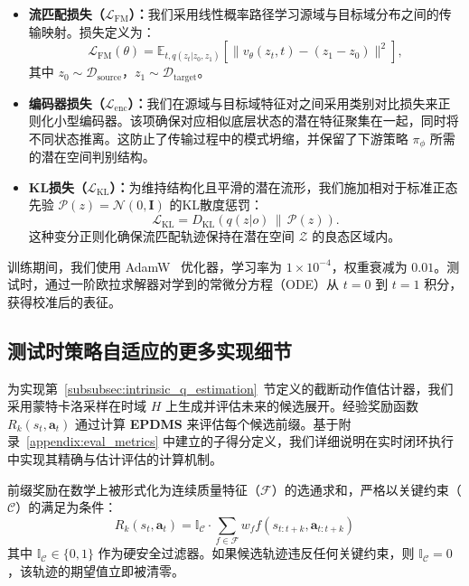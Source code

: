 \documentclass{article}
\begin{document}
\begin{itemize}
    \item \textbf{流匹配损失（$\mathcal{L}_{\mathrm{FM}}$）：}我们采用线性概率路径学习源域与目标域分布之间的传输映射。损失定义为：
    \begin{equation}
        \mathcal{L}_{\mathrm{FM}}(\theta) = \mathbb{E}_{t, q(z_t|z_0, z_1)} \left[ \| v_\theta(z_t, t) - (z_1 - z_0) \|^2 \right],
    \end{equation}
    其中 $z_0 \sim \mathcal{D}_{\mathrm{source}}$，$z_1 \sim \mathcal{D}_{\mathrm{target}}$。

    \item \textbf{编码器损失（$\mathcal{L}_{\mathrm{enc}}$）：}我们在源域与目标域特征对之间采用类别对比损失来正则化小型编码器。该项确保对应相似底层状态的潜在特征聚集在一起，同时将不同状态推离。这防止了传输过程中的模式坍缩，并保留了下游策略 $\pi_\phi$ 所需的潜在空间判别结构。

    \item \textbf{KL损失（$\mathcal{L}_{\mathrm{KL}}$）：}为维持结构化且平滑的潜在流形，我们施加相对于标准正态先验 $\mathcal{P}(z) = \mathcal{N}(0, \mathbf{I})$ 的KL散度惩罚：
    \begin{equation}
        \mathcal{L}_{\mathrm{KL}} = D_{\mathrm{KL}}(q(z|o) \,\|\, \mathcal{P}(z)).
    \end{equation}
    这种变分正则化确保流匹配轨迹保持在潜在空间 $\mathcal{Z}$ 的良态区域内。
\end{itemize}

训练期间，我们使用 AdamW~\cite{kingma2014adam} 优化器，学习率为 $1 \times 10^{-4}$，权重衰减为 $0.01$。测试时，通过一阶欧拉求解器对学到的常微分方程（ODE）从 $t=0$ 到 $t=1$ 积分，获得校准后的表征。

\subsection{测试时策略自适应的更多实现细节}
\label{appendix:test-time-adaptation}

为实现第~\ref{subsubsec:intrinsic_q_estimation}~节定义的截断动作值估计器，我们采用蒙特卡洛采样在时域 $H$ 上生成并评估未来的候选展开。经验奖励函数 $R_k(s_t, \mathbf{a}_t)$ 通过计算 \textbf{EPDMS} 来评估每个候选前缀。基于附录~\ref{appendix:eval_metrics} 中建立的子得分定义，我们详细说明在实时闭环执行中实现其精确与估计评估的计算机制。

前缀奖励在数学上被形式化为连续质量特征（$\mathcal{F}$）的选通求和，严格以关键约束（$\mathcal{C}$）的满足为条件：
\begin{equation}
    R_k(s_t, \mathbf{a}_t) = \mathbb{I}_{\mathcal{C}} \cdot \sum_{f \in \mathcal{F}} w_f f(s_{t:t+k}, \mathbf{a}_{t:t+k})
\end{equation}
其中 $\mathbb{I}_{\mathcal{C}} \in \{0, 1\}$ 作为硬安全过滤器。如果候选轨迹违反任何关键约束，则 $\mathbb{I}_{\mathcal{C}} = 0$，该轨迹的期望值立即被清零。
\end{document}
